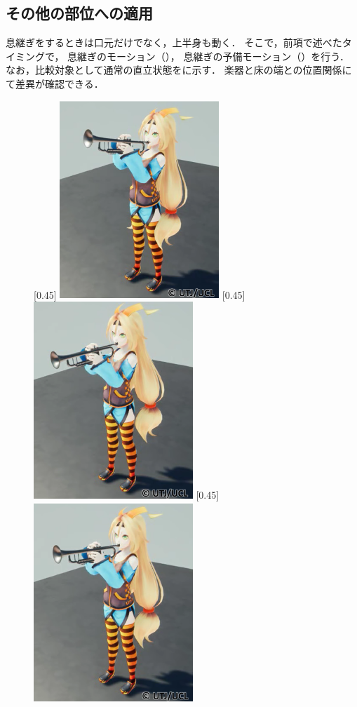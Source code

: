 \subsection{その他の部位への適用}
\indent
息継ぎをするときは口元だけでなく，上半身も動く．
そこで，前項で述べたタイミングで，
息継ぎのモーション（），
息継ぎの予備モーション（）を行う．
なお，比較対象として通常の直立状態をに示す．
楽器と床の端との位置関係にて差異が確認できる．\\
\begin{figure}[!h]
	\centering
	[0.45\linewidth]{
		\includegraphics[width=6cm]{fig/chap3/up.eps}}
	[0.45\linewidth]{
		\includegraphics[width=6cm]{fig/chap3/down.eps}}
	[0.45\linewidth]{
		\includegraphics[width=6cm]{fig/chap3/default.eps}}

\end{figure}
